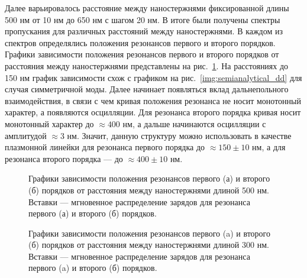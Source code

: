 Далее варьировалось расстояние между наностержнями фиксированной длины 500 нм от 10 нм до 650 нм с шагом 20 нм. В итоге были получены спектры пропускания для различных расстояний между наностержнями. В каждом из спектров определялись положения резонансов первого и второго порядков. Графики зависимости положения резонансов первого и второго порядков от расстояния между наностержнями представлены на рис.~\ref{img:a500PML}. На расстояниях до 150 нм график зависимости схож с графиком на рис.~\ref{img:semianalytical_dd} для случая симметричной моды. Далее начинает появляться вклад дальнепольного взаимодействия, в связи с чем кривая положения резонанса не носит монотонный характер, а появляются осцилляции. Для резонанса второго порядка кривая носит монотонный характер до $ \approx 400 $ нм, а дальше начинаются осцилляции с амплитудой $ \approx 3 $ нм. Значит, данную структуру можно использовать в качестве плазмонной линейки для резонанса первого порядка до $ \approx 150 \pm 10 $ нм, а для резонанса второго порядка --- до $ \approx 400 \pm 10 $ нм.

\begin{figure}
\caption{Графики зависимости положения  резонансов первого (а) и второго (б) порядков от расстояния между наностержнями длиной 500 нм. Вставки --- мгновенное распределение зарядов для резонанса первого (а) и второго (б) порядков.}
\label{img:a500PML}
\end{figure}
\begin{figure}
\caption{Графики зависимости положения  резонансов первого (a) и второго (б) порядков от расстояния между наностержнями длиной 300 нм. Вставки --- мгновенное распределение зарядов для резонанса первого (a) и второго (б) порядков.}
\label{img:a300PML}
\end{figure}

